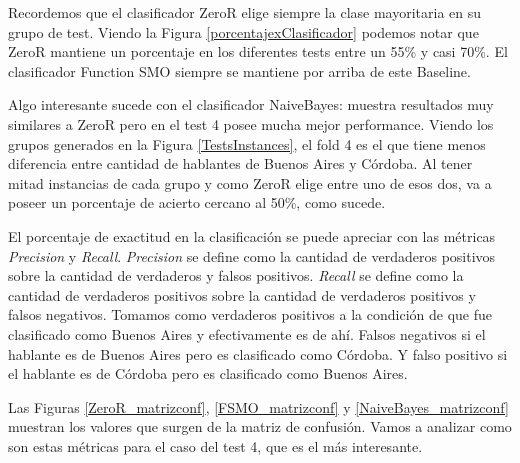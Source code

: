 Recordemos que el clasificador ZeroR elige siempre la clase mayoritaria en su grupo de test. Viendo la Figura \ref{porcentajexClasificador} podemos notar que ZeroR mantiene un porcentaje en los diferentes tests entre un 55\% y casi 70\%. El clasificador Function SMO siempre se mantiene por arriba de este Baseline.

Algo interesante sucede con el clasificador NaiveBayes: muestra resultados muy similares a ZeroR pero en el test 4 posee mucha mejor performance. Viendo los grupos generados en la Figura \ref{TestsInstances}, el fold 4 es el que tiene menos diferencia entre cantidad de hablantes de Buenos Aires y Córdoba. Al tener mitad instancias de cada grupo y como ZeroR elige entre uno de esos dos, va a poseer un porcentaje de acierto cercano al 50\%, como sucede.  

El porcentaje de exactitud en la clasificación se puede apreciar con las métricas \textit{Precision} y \textit{Recall}. \textit{Precision} se define como la cantidad de verdaderos positivos sobre la cantidad de verdaderos y falsos positivos. \textit{Recall} se define como la cantidad de verdaderos positivos sobre la cantidad de verdaderos positivos y falsos negativos. Tomamos como verdaderos positivos a la condición de que fue clasificado como Buenos Aires y efectivamente es de ahí. Falsos negativos si el hablante es de Buenos Aires pero es clasificado como Córdoba. Y falso positivo si el hablante es de Córdoba pero es clasificado como Buenos Aires. 


Las Figuras \ref{ZeroR_matrizconf}, \ref{FSMO_matrizconf} y \ref{NaiveBayes_matrizconf} muestran los valores que  surgen de la matriz de confusión. Vamos a analizar como son estas métricas para el caso del test 4, que es el más interesante.



